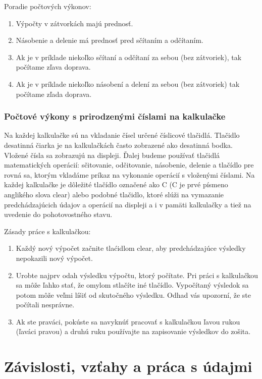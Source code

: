 \documentclass{report}
\begin{document}
Poradie počtových výkonov:
\begin{enumerate}[label=\arabic*)]
  \item Výpočty v zátvorkách majú prednosť.
  \item Násobenie a delenie má prednosť pred sčítaním a odčítaním.
  \item Ak je v príklade niekoľko sčítaní a odčítaní za sebou (bez zátvoriek), tak počítame zľava doprava.
  \item Ak je v príklade niekoľko násobení a delení za sebou (bez zátvoriek) tak počítame zľada doprava.
\end{enumerate}

\section{Počtové výkony s prirodzenými číslami na kalkulačke}

Na každej kalkulačke sú na vkladanie čísel určené číslicové tlačidlá. Tlačidlo desatinná čiarka je na kalkulačkách často zobrazené ako desatinná bodka. Vložené čísla sa zobrazujú na displeji. Ďalej budeme používať tlačidlá matematických operácií: sčitovanie, odčitovanie, násobenie, delenie a tlačídlo pre rovná sa, ktorým vkladáme príkaz na vykonanie operácií s vloženými číslami. Na každej kalkulačke je dôležité tlačídlo označené ako C (C je prvé písmeno anglikého slova clear) alebo podobné tlačidlo, ktoré slúži na vymazanie predchádzajúcich údajov a operácií na displeji a i v pamäti kalkulačky a tiež na uvedenie do pohotovostného stavu.

Zásady práce s kalkulačkou:
\begin{enumerate}[label=\arabic*)]
  \item Každý nový výpočet začnite tlaćidlom clear, aby predchádzajúce výsledky nepokazili nový výpočet.
  \item Urobte najprv odah výsledku výpočtu, ktorý počítate. Pri práci s kalkulačkou sa môže ľahko stať, že omylom stlačíte iné tlačídlo. Vypočítaný výsledok sa potom môže veľmi líšiť od skutočného výsledku. Odhad vás upozorní, že ste počítali nesprávne.
  \item Ak ste praváci, pokúste sa navyknúť pracovať s kalkulačkou ľavou rukou (ľaváci pravou) a druhú ruku používajte na zapisovanie výsledkov do zošita.
\end{enumerate}

\part{Závislosti, vzťahy a práca s údajmi}
\end{document}
